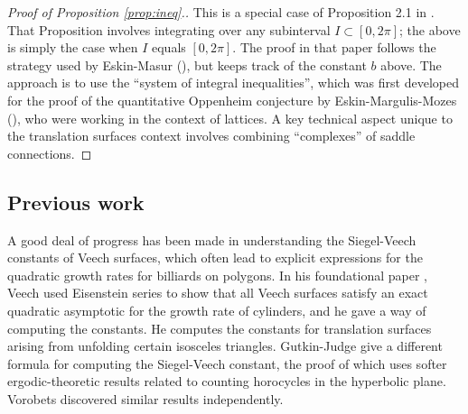 \documentclass{article}
\theoremstyle{definition}
\begin{document}


\begin{proof}[Proof of Proposition \ref{prop:ineq}.]
  This is a special case of Proposition 2.1 in \cite{dozier2017}.  That Proposition involves integrating over any subinterval $I\subset [0,2\pi]$; the above is simply the case when $I$ equals $[0,2\pi]$.  The proof in that paper follows the strategy used by Eskin-Masur (\cite{em2001}), but keeps track of the constant $b$ above.  The approach is to use the ``system of integral inequalities'', which was first developed for the proof of the quantitative Oppenheim conjecture by Eskin-Margulis-Mozes (\cite{emm1998}), who were working in the context of lattices.  A key technical aspect unique to the translation surfaces context involves combining ``complexes'' of saddle connections.  
\end{proof}


\subsection{Previous work}
\label{sec:previous-work}
A good deal of progress has been made in understanding the Siegel-Veech constants of Veech surfaces, which often lead to explicit expressions for the quadratic growth rates for billiards on polygons.   In his foundational paper \cite{veech1989}, Veech used Eisenstein series to show that all Veech surfaces satisfy an exact quadratic asymptotic for the growth rate of cylinders, and he gave a way of computing the constants.  He computes the constants for translation surfaces arising from unfolding certain isosceles triangles.  Gutkin-Judge \cite{gj2000} give a different formula for computing the Siegel-Veech constant, the proof of which uses softer ergodic-theoretic results related to counting horocycles in the hyperbolic plane.  Vorobets \cite{vorobets1996} discovered similar results independently.  
\end{document}
